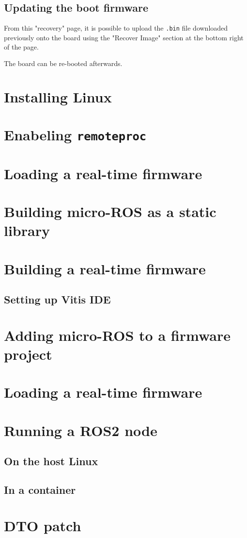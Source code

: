 \documentclass[10pt]{article}
\begin{document}
\subsection{Updating the boot firmware}
\label{sec:orga85dbb7}
From this "recovery" page, it is possible to upload the \texttt{.bin} file downloaded previously onto
the board using the "Recover Image" section at the bottom right of the page.

The board can be re-booted afterwards.

\section{Installing Linux}
\label{sec:orgffb0e49}

\section{Enabeling \texttt{remoteproc}}
\label{sec:org5e002bf}

\section{Loading a real-time firmware}
\label{sec:org592c9d4}

\section{Building micro-ROS as a static library}
\label{sec:org614c6bb}

\section{Building a real-time firmware}
\label{sec:org8d40ae3}

\subsection{Setting up Vitis IDE}
\label{sec:org32198f0}

\section{Adding micro-ROS to a firmware project}
\label{sec:org52988a4}

\section{Loading a real-time firmware}
\label{sec:orgc3ff4b7}

\section{Running a ROS2 node}
\label{sec:org9ead220}

\subsection{On the host Linux}
\label{sec:orga58a0ee}

\subsection{In a container}
\label{sec:org04afd82}


\appendix
\section{DTO patch}
\label{sec:org37f2fd5}
\end{document}
